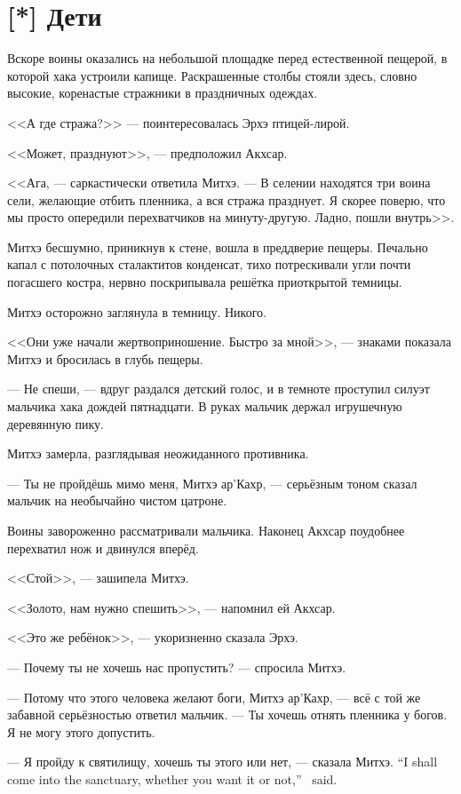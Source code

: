 \section{[*] Дети}

Вскоре воины оказались на небольшой площадке перед естественной пещерой, в которой хака устроили капище.
Раскрашенные столбы стояли здесь, словно высокие, коренастые стражники в праздничных одеждах.

<<А где стража?>> --- поинтересовалась Эрхэ птицей-лирой.

<<Может, празднуют>>, --- предположил Акхсар.

<<Ага, --- саркастически ответила Митхэ.
--- В селении находятся три воина сели, желающие отбить пленника, а вся стража празднует.
Я скорее поверю, что мы просто опередили перехватчиков на минуту-другую.
Ладно, пошли внутрь>>.

Митхэ бесшумно, приникнув к стене, вошла в преддверие пещеры.
Печально капал с потолочных сталактитов конденсат, тихо потрескивали угли почти погасшего костра, нервно поскрипывала решётка приоткрытой темницы.

Митхэ осторожно заглянула в темницу.
Никого.

<<Они уже начали жертвоприношение. Быстро за мной>>, --- знаками показала Митхэ и бросилась в глубь пещеры.

--- Не спеши, --- вдруг раздался детский голос, и в темноте проступил силуэт мальчика хака дождей пятнадцати.
В руках мальчик держал игрушечную деревянную пику.

Митхэ замерла, разглядывая неожиданного противника.

--- Ты не пройдёшь мимо меня, Митхэ ар’Кахр, --- серьёзным тоном сказал мальчик на необычайно чистом цатроне.

Воины завороженно рассматривали мальчика.
Наконец Акхсар поудобнее перехватил нож и двинулся вперёд.

<<Стой>>, --- зашипела Митхэ.

<<Золото, нам нужно спешить>>, --- напомнил ей Акхсар.

<<Это же ребёнок>>, --- укоризненно сказала Эрхэ.

--- Почему ты не хочешь нас пропустить? --- спросила Митхэ.

--- Потому что этого человека желают боги, Митхэ ар’Кахр, --- всё с той же забавной серьёзностью ответил мальчик.
--- Ты хочешь отнять пленника у богов.
Я не могу этого допустить.

{--- Я пройду к святилищу, хочешь ты этого или нет, --- сказала Митхэ.}
{``I shall come into the sanctuary, whether you want it or not,'' \Mitchoe\ said.}

